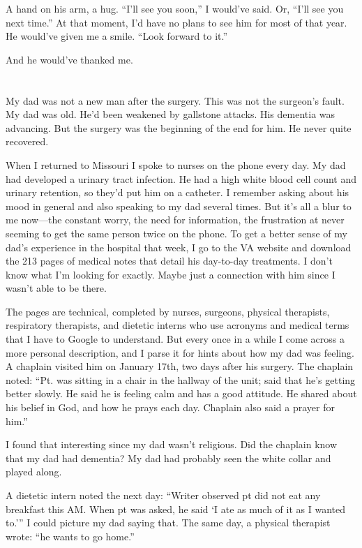 \documentclass[12pt]{book}
\begin{document}
A hand on his arm, a hug. ``I'll see you soon,'' I would've said. Or, ``I'll see you next time.'' At that moment, I'd have no plans to see him for most of that year. He would've given me a smile. ``Look forward to it.''

And he would've thanked me.  


\chapter{}

My dad was not a new man after the surgery. This was not the surgeon's fault. My dad was old. He'd been weakened by gallstone attacks. His dementia was advancing. But the surgery was the beginning of the end for him. He never quite recovered.

When I returned to Missouri I spoke to nurses on the phone every day. My dad had developed a urinary tract infection. He had a high white blood cell count and urinary retention, so they'd put him on a catheter. I remember asking about his mood in general and also speaking to my dad several times. But it's all a blur to me now---the constant worry, the need for information, the frustration at never seeming to get the same person twice on the phone. To get a better sense of my dad's experience in the hospital that week, I go to the VA website and download the 213 pages of medical notes that detail his day-to-day treatments. I don't know what I'm looking for exactly. Maybe just a connection with him since I wasn't able to be there.

The pages are technical, completed by nurses, surgeons, physical therapists, respiratory therapists, and dietetic interns who use acronyms and medical terms that I have to Google to understand. But every once in a while I come across a more personal description, and I parse it for hints about how my dad was feeling. A chaplain visited him on January 17th, two days after his surgery. The chaplain noted: ``Pt. was sitting in a chair in the hallway of the unit; said that he's getting better slowly. He said he is feeling calm and has a good attitude. He shared about his belief in God, and how he prays each day. Chaplain also said a prayer for him.''

I found that interesting since my dad wasn't religious. Did the chaplain know that my dad had dementia? My dad had probably seen the white collar and played along.

A dietetic intern noted the next day: ``Writer observed pt did not eat any breakfast this AM. When pt was asked, he said `I ate as much of it as I wanted to.''' I could picture my dad saying that. The same day, a physical therapist wrote: ``he wants to go home.''
\end{document}
